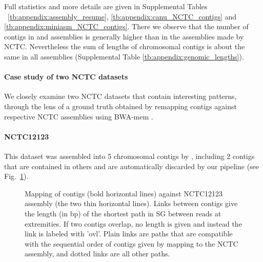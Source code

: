 \documentclass[./main.tex]{subfiles}
\newcommand{\modafterreview}[1]{#1}
\begin{document}
Full statistics and more details are given in Supplemental Tables ~\ref{tb:appendix:assembly_resume}, \ref{tb:appendix:canu_NCTC_contigs} and \ref{tb:appendix:miniasm_NCTC_contigs}. 
There we observe that the number of contigs in \canu and \miniasm    assemblies is generally higher than in the assemblies made by NCTC.
%
Nevertheless the sum of lengths of chromosomal contigs is about the same in all assemblies (Supplemental Table \ref{tb:appendix:genomic_lengths}).



\paragraph{Case study of two NCTC datasets}

We closely examine two NCTC datasets that contain interesting patterns, through the lens of a ground truth obtained by remapping \canu contigs against respective NCTC assemblies using BWA-mem \citep{bwamem}.
%
% 



\paragraph{NCTC12123} 

This dataset was assembled into 5 chromosomal  contigs by \canu, including 2 contigs that are contained in others and are automatically discarded by our pipeline (see Fig.~\ref{fg:NCTC12123}). 
\begin{figure}[htbp]
    \centering
    \modafterreview{
	 
    }
    \caption{Mapping of \canu contigs (bold horizontal lines) against NCTC12123 assembly (the two thin horizontal lines). \modafterreview{Links between contigs give the length (in bp) of the shortest path in SG between reads at extremities. If two contigs overlap, no length is given and instead the link is labeled with 'ovl'}. 
    Plain links are paths that are compatible with the sequential order of contigs given  by mapping to the NCTC assembly, and dotted links are all other paths.}
    \label{fg:NCTC12123}
\end{figure}
\end{document}
